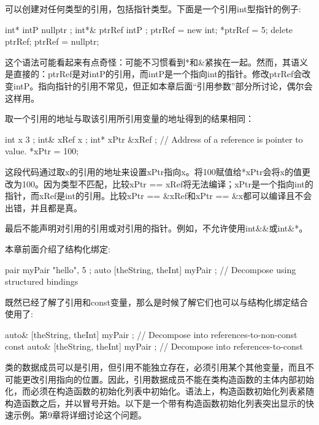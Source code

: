 可以创建对任何类型的引用，包括指针类型。下面是一个引用int型指针的例子:

\begin{cpp}
int* intP { nullptr };
int*& ptrRef { intP };
ptrRef = new int;
*ptrRef = 5;
delete ptrRef; ptrRef = nullptr;
\end{cpp}

这个语法可能看起来有点奇怪：可能不习惯看到*和\&紧挨在一起。然而，其语义是直接的：ptrRef是对intP的引用，而intP是一个指向int的指针。修改ptrRef会改变intP。指向指针的引用不常见，但正如本章后面“引用参数”部分所讨论，偶尔会这样用。

取一个引用的地址与取该引用所引用变量的地址得到的结果相同：

\begin{cpp}
int x { 3 };
int& xRef { x };
int* xPtr { &xRef }; // Address of a reference is pointer to value.
*xPtr = 100;
\end{cpp}

这段代码通过取x的引用的地址来设置xPtr指向x。将100赋值给*xPtr会将x的值更改为100。因为类型不匹配，比较xPtr == xRef将无法编译；xPtr是一个指向int的指针，而xRef是int的引用。比较xPtr == \&xRef和xPtr == \&x都可以编译且不会出错，并且都是真。

最后不能声明对引用的引用或对引用的指针。例如，不允许使用int\&\&或int\&*。


本章前面介绍了结构化绑定:

\begin{cpp}
pair myPair { "hello", 5 };
auto [theString, theInt] { myPair }; // Decompose using structured bindings
\end{cpp}

既然已经了解了引用和const变量，那么是时候了解它们也可以与结构化绑定结合使用了:

\begin{cpp}
auto& [theString, theInt] { myPair }; // Decompose into references-to-non-const
const auto& [theString, theInt] { myPair }; // Decompose into references-to-const
\end{cpp}


类的数据成员可以是引用，但引用不能独立存在，必须引用某个其他变量，而且不可能更改引用指向的位置。因此，引用数据成员不能在类构造函数的主体内部初始化，而必须在构造函数的初始化列表中初始化。语法上，构造函数初始化列表紧随构造函数之后，并以冒号开始。以下是一个带有构造函数初始化列表突出显示的快速示例。第9章将详细讨论这个问题。

